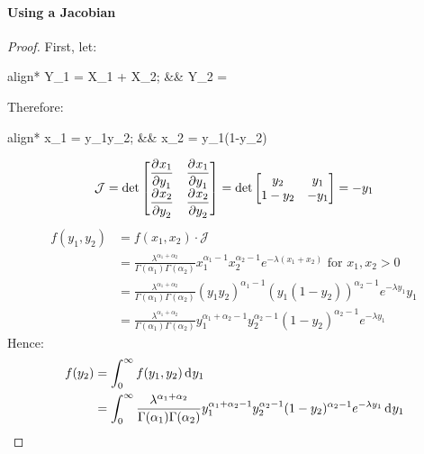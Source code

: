 \documentclass[12pt]{article}
\newcommand{\J}{\mathcal{J}}
\begin{document}
\paragraph{Using a Jacobian}
\begin{proof}
	First, let:
	\begin{empheq}[box=\widefbox]{align*}
		Y_1 = X_1 + X_2;	&&	Y_2 = 
	\end{empheq}
	Therefore:
	\begin{empheq}[box=\widefbox]{align*}
		x_1 = y_1y_2;	&&	x_2 = y_1(1-y_2)
	\end{empheq}
	\begin{equation}
		\J = \det\begin{bmatrix}
			\pderiv{x_1}{y_1}	&	\pderiv{x_1}{y_1}\\[6pt]
			\pderiv{x_2}{y_2}	&	\pderiv{x_2}{y_2}
			\end{bmatrix} = \det\begin{bmatrix}
				y_2		&	y_1\\
				1-y_2	&	-y_1
			\end{bmatrix} = -y_1
	\end{equation}
	\begin{equation}
		\begin{split}
			f(y_1, y_2)	&=	f(x_1, x_2)\cdot\J\\
						&=	\frac{\lambda^{\alpha_1+\alpha_2}}{\Gamma(\alpha_1)\Gamma(\alpha_2)}x_1^{\alpha_1-1}x_2^{\alpha_2-1}e^{-\lambda(x_1+x_2)}\text{ for }x_1, x_2>0\\
						&=	\frac{\lambda^{\alpha_1+\alpha_2}}{\Gamma(\alpha_1)\Gamma(\alpha_2)}(y_1y_2)^{\alpha_1-1}(y_1(1-y_2))^{\alpha_2-1}e^{-\lambda y_1}y_1\\
						&=	\frac{\lambda^{\alpha_1+\alpha_2}}{\Gamma(\alpha_1)\Gamma(\alpha_2)}y_1^{\alpha_1+\alpha_2-1}y_2^{\alpha_2-1}(1-y_2)^{\alpha_2-1}e^{-\lambda y_1}
		\end{split}
	\end{equation}
	Hence:
	\begin{equation}
		\begin{split}
			f(y_2)	&=	\int^\infty_0 f(y_1, y_2)\mathop{}\!\mathrm{d^{}}y_1\\
					&=	\int^\infty_0 \frac{\lambda^{\alpha_1+\alpha_2}}{\Gamma(\alpha_1)\Gamma(\alpha_2)}y_1^{\alpha_1+\alpha_2-1}y_2^{\alpha_2-1}(1-y_2)^{\alpha_2-1}e^{-\lambda y_1}\mathop{}\!\mathrm{d^{}}y_1
		\end{split}
	\end{equation}
	\pagebreak


\end{proof}
\end{document}
